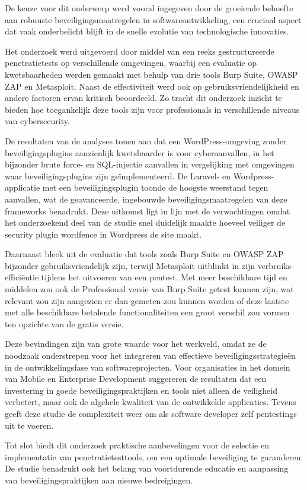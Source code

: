 De keuze voor dit onderwerp werd vooral ingegeven door de groeiende behoefte aan robuuste beveiligingsmaatregelen in softwareontwikkeling, een cruciaal 
aspect dat vaak onderbelicht blijft in de snelle evolutie van technologische innovaties. 

Het onderzoek werd uitgevoerd door middel van een reeks gestructureerde penetratietests op verschillende omgevingen, waarbij een evaluatie op 
kwetsbaarheden werden gemaakt met behulp van drie tools Burp Suite, OWASP ZAP en Metasploit. Naast de effectiviteit werd ook op gebruiksvriendelijkheid en andere factoren 
ervan kritisch beoordeeld. Zo tracht dit onderzoek inzicht te bieden hoe toegankelijk deze tools zijn voor professionals in verschillende 
niveaus van cybersecurity.

De resultaten van de analyses tonen aan dat een WordPress-omgeving zonder beveiligingsplugins aanzienlijk kwetsbaarder is voor cyberaanvallen, in het bijzonder  
brute force- en SQL-injectie aanvallen in vergelijking met omgevingen waar beveiligingsplugins zijn geïmplementeerd. De Laravel- 
en Wordpress-applicatie met een beveiligingsplugin toonde 
de hoogste weerstand tegen aanvallen, wat de geavanceerde, ingebouwde beveiligingsmaatregelen van deze frameworks benadrukt.
Deze uitkomst ligt in lijn met de verwachtingen omdat het onderzoekend deel van de studie snel duidelijk maakte hoeveel veiliger 
de security plugin wordfence in Wordpress de site maakt.

Daarnaast bleek uit de evaluatie dat tools zoals Burp Suite en OWASP ZAP bijzonder gebruiksvriendelijk zijn, terwijl Metasploit 
uitblinkt in zijn verbruiks-efficiëntie tijdens het uitvoeren van een pentest. Met meer beschikbare tijd en middelen zou ook 
de Professional versie van Burp Suite getest kunnen zijn, wat relevant zou zijn aangezien er dan gemeten zou kunnen worden of deze 
laatste met alle beschikbare betalende functionaliteiten een groot verschil zou vormen ten opzichte van de gratis versie.

Deze bevindingen zijn van grote waarde voor het werkveld, omdat ze de noodzaak onderstrepen voor het integreren van effectieve 
beveiligingsstrategieën in de ontwikkelingsfase van softwareprojecten. Voor organisaties in het domein van Mobile en Enterprise 
Development suggereren de resultaten dat een investering in goede beveiligingspraktijken en tools niet alleen de veiligheid 
verbetert, maar ook de algehele kwaliteit van de ontwikkelde applicaties. Tevens geeft deze studie de complexiteit weer 
om als software developer zelf pentestings uit te voeren.

Tot slot biedt dit onderzoek praktische aanbevelingen voor de selectie en implementatie van penetratietesttools, 
om een optimale beveiliging te 
garanderen. De studie benadrukt ook het belang van voortdurende educatie en aanpassing van beveiligingspraktijken aan nieuwe 
bedreigingen.
